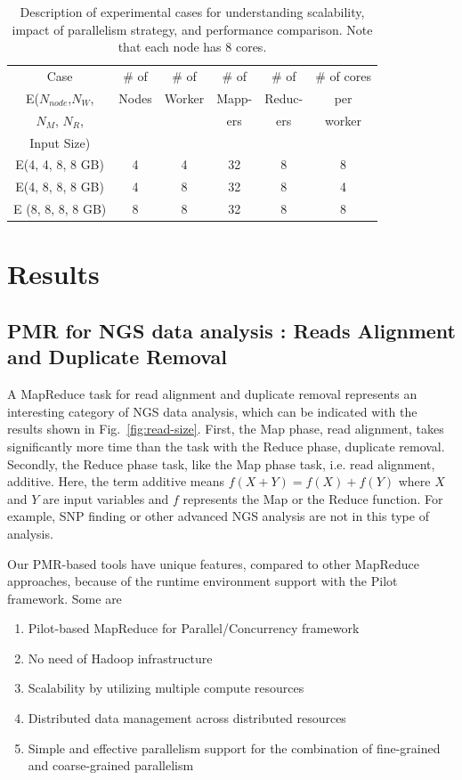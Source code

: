 \documentclass{sig-alternate}
\begin{document}
\begin{table}
\small
 \begin{tabular}{|c|c|c|c|c|c|} 
 \hline 

Case & \# of  & \# of &  \# of & \# of & \# of cores \\
E($N_{node}$,$N_W$,  & Nodes & Worker   & Mapp- & Reduc- & per   \\
$N_M$, $N_R$,  & &  & ers & ers & worker \\
Input Size) & & & & & \\
 \hline
E(4, 4, 8, 8 GB) &4 &  4 & 32  & 8 & 8 \\
E(4, 8, 8, 8 GB) & 4 & 8 & 32 & 8 & 4 \\
E (8, 8, 8, 8 GB) & 8 & 8 & 32 & 8 & 8 \\ 
 \hline
 \end{tabular}

 \caption{Description of experimental cases for understanding scalability, impact of parallelism strategy, and performance comparison. Note that each node has 8 cores.}
    \label{table:exp-description} 
\end{table}


\section{Results}\label{sec:results}



\subsection{PMR for NGS data analysis : Reads Alignment and Duplicate Removal}

A MapReduce task for read alignment and duplicate removal represents an interesting category of NGS data analysis, which can be indicated with the results shown in  Fig.~\ref{fig:read-size}.  First, the Map phase, read alignment, takes significantly more time than the task with the Reduce phase, duplicate removal.  Secondly, the Reduce phase task, like the Map phase task, i.e. read alignment, additive.  Here, the term additive means $f(X + Y) = f(X) + f(Y)$ where $X$ and $Y$ are input variables and $f$ represents the Map or the Reduce function. For example, SNP finding or other advanced NGS analysis are not in this type of analysis.   

Our PMR-based tools have unique features, compared to other MapReduce approaches, because of the runtime environment support with the Pilot framework\cite{dare-tg11, pmr2012}.  Some are 
\begin{enumerate}

\item Pilot-based MapReduce for Parallel/Concurrency framework 
\item No need of Hadoop infrastructure
\item Scalability by utilizing multiple compute resources
\item Distributed data management across distributed resources
\item Simple and effective parallelism support for the combination of fine-grained and coarse-grained parallelism
\end{enumerate}
 
\end{document}
